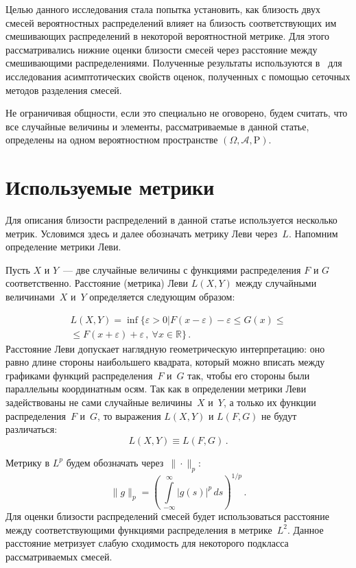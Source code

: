 \begin{multicols}{2}
Целью данного исследования стала попытка установить, как близость
двух смесей вероятностных распределений влияет на близость
со\-от\-вет\-ст\-вующих им смешивающих распределений в некоторой
вероятностной метрике. Для этого \mbox{рассматривались} нижние оценки
близости смесей через расстояние между смешивающими распределениями.
Полученные результаты используются в~\cite{NazConvUnpubl} для
исследования асимптотических свойств оценок, полученных с помощью
сеточных методов разделения смесей.

Не ограничивая общности, если это специально не оговорено, будем
считать, что все случайные величины и элементы, рассматриваемые в
данной статье, определены на одном вероятностном пространстве
$(\Omega,\mathcal{A},\mathrm{P})$.

\vspace*{-6pt}

\section{Используемые метрики}

Для описания близости  распределений в данной статье используется
несколько   метрик.  Условимся здесь и далее обозначать  метрику
Леви через~$L$. Напомним определение метрики Леви.

Пусть $X$ и $Y$~--- две случайные величины с функциями распределения
$F$ и $G$ соответственно. Расстояние (метрика) Леви $L(X,Y)$ между
случайными величинами~$X$ и~$Y$ определяется следующим образом:

\noindent
\begin{multline*}
L(X, Y) = \inf \{ \varepsilon > 0 | F(x - \varepsilon) - 
\varepsilon \leq G(x) \leq{}\\
{}\leq F(x + \varepsilon) + \varepsilon\,, \ \forall x \in \mathbb{R} \}\,.
\end{multline*}
Расстояние Леви допускает наглядную геометрическую интерпретацию:
оно равно длине стороны наибольшего квадрата, который можно
вписать между графиками функций распределения~$F$ и~$G$ так,
чтобы его стороны были параллельны координатным осям. Так как в
определении метрики Леви задействованы не сами случайные величины~$X$ 
и~$Y$, а только их функции распределения~$F$ и~$G$, то
выражения $L(X,Y)$ и $L(F,G)$ не будут различаться:
$$
L(X,Y)\equiv L(F,G)\,.
$$

Метрику  в $L^p$  будем обозначать через~$\|\cdot \|_p$:
$$
\|g \|_{p} = \left(\,
\int\limits_{-\infty}^{\infty} |g(s)|^p\, ds
\right)^{1/p}\,.
$$
Для оценки близости распределений смесей будет использоваться
расстояние между со\-от\-вет\-ст\-ву\-ющи\-ми функциями распределения в метрике~$L^2$. 
Данное расстояние метризует слабую сходимость для некоторого
подкласса рассматриваемых смесей.
{

}
\end{multicols}
